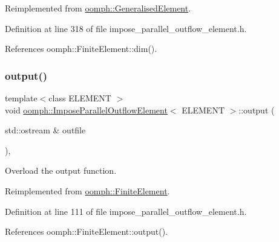 Reimplemented from \hyperlink{classoomph_1_1GeneralisedElement_a0c6037a870597b35dcf1c780710b9a56}{oomph\+::\+Generalised\+Element}.



Definition at line 318 of file impose\+\_\+parallel\+\_\+outflow\+\_\+element.\+h.



References oomph\+::\+Finite\+Element\+::dim().

\mbox{\label{classoomph_1_1ImposeParallelOutflowElement_ac423772737af10cd5efd0c49c3cdef80}} 
\subsubsection{\texorpdfstring{output()}{output()}\hspace{0.1cm}{\footnotesize\ttfamily [1/2]}}
{\footnotesize\ttfamily template$<$class E\+L\+E\+M\+E\+NT $>$ \\
void \hyperlink{classoomph_1_1ImposeParallelOutflowElement}{oomph\+::\+Impose\+Parallel\+Outflow\+Element}$<$ E\+L\+E\+M\+E\+NT $>$\+::output (\begin{DoxyParamCaption}\item[{std\+::ostream \&}]{outfile }\end{DoxyParamCaption})\hspace{0.3cm}{\ttfamily [inline]}, {\ttfamily [virtual]}}



Overload the output function. 



Reimplemented from \hyperlink{classoomph_1_1FiniteElement_a2ad98a3d2ef4999f1bef62c0ff13f2a7}{oomph\+::\+Finite\+Element}.



Definition at line 111 of file impose\+\_\+parallel\+\_\+outflow\+\_\+element.\+h.



References oomph\+::\+Finite\+Element\+::output().

\mbox{\label{classoomph_1_1ImposeParallelOutflowElement_a94fce0938876acf656a7c43fc53aa8ca}} 
